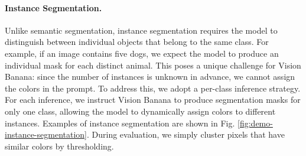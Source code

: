 \documentclass[11pt, a4paper, copyright, gdm]{google}
\begin{document}
\paragraph{Instance Segmentation.}


Unlike semantic segmentation, instance segmentation requires the model to distinguish between individual objects that belong to the same class.
For example, if an image contains five dogs, we expect the model to produce an individual mask for each distinct animal.
This poses a unique challenge for Vision Banana: since the number of instances is unknown in advance, we cannot assign the colors in the prompt.
To address this, we adopt a per-class inference strategy. For each inference, we instruct Vision Banana to produce segmentation masks for only one class, allowing the model to dynamically assign colors to different instances.
Examples of instance segmentation are shown in Fig. \ref{fig:demo-instance-segmentation}.
During evaluation, we simply cluster pixels that have similar colors by thresholding.
\end{document}
